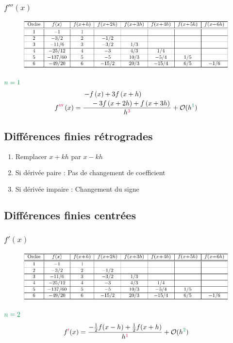 \documentclass[resume]{subfiles}
\begin{document}
\subsubsection{$f'''(x)$}
\begin{figure}[H]
\centering
\includegraphics[width=\columnwidth,page=3]{diff_finies_tableaux.pdf}
\end{figure}
$\textcolor{ForestGreen}{n=1}$
$$f\textcolor{OrangeRed}{'''}\left(x\right)=\frac{\splitdfrac{-f\left(x\right)+3f\left(x+h\right)}{-3f\left(x+2h\right)+f\left(x+3h\right)}}{h^{\textcolor{OrangeRed}{3}}}+\mathcal{O}(h^{\textcolor{ForestGreen}{1}})$$
\subsection{Différences finies rétrogrades}
\begin{enumerate}
\item Remplacer $x+kh$ par $x-kh$
\item Si dérivée paire : Pas de changement de coefficient
\item Si dérivée impaire : Changement du signe
\end{enumerate}
\subsection{Différences finies centrées}
\subsubsection{$f'(x)$}
\begin{figure}[H]
\centering
\includegraphics[width=\columnwidth,page=5]{diff_finies_tableaux.pdf}
\end{figure}
$\textcolor{ForestGreen}{n=2}$
$$f\textcolor{OrangeRed}{'}(x)=\frac{-\frac{1}{2}f(x-h)+\frac{1}{2}f(x+h)}{h^{\textcolor{OrangeRed}{1}}}+\mathcal{O}(h^{\textcolor{ForestGreen}{2}})$$
\end{document}

